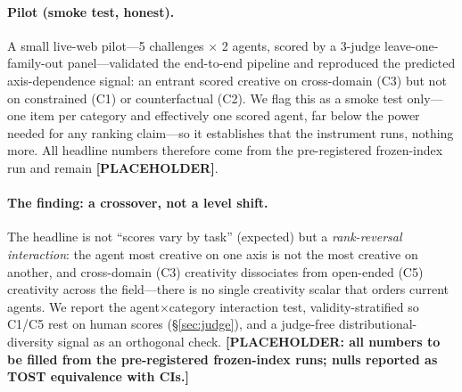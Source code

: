 \paragraph{Pilot (smoke test, honest).} A small live-web pilot---5 challenges $\times$ 2 agents, scored by a 3-judge leave-one-family-out panel---validated the end-to-end pipeline and reproduced the predicted axis-dependence signal: an entrant scored creative on cross-domain (C3) but not on constrained (C1) or counterfactual (C2). We flag this as a smoke test only---one item per category and effectively one scored agent, far below the power needed for any ranking claim---so it establishes that the instrument runs, nothing more. All headline numbers therefore come from the pre-registered frozen-index run and remain \textbf{[PLACEHOLDER]}.

\paragraph{The finding: a crossover, not a level shift.} The headline is not ``scores vary by task'' (expected) but a \emph{rank-reversal interaction}: the agent most creative on one axis is not the most creative on another, and cross-domain (C3) creativity dissociates from open-ended (C5) creativity across the field---there is no single creativity scalar that orders current agents. We report the agent$\times$category interaction test, validity-stratified so C1/C5 rest on human scores (\S\ref{sec:judge}), and a judge-free distributional-diversity signal as an orthogonal check. \textbf{[PLACEHOLDER: all numbers to be filled from the pre-registered frozen-index runs; nulls reported as TOST equivalence with CIs.]}
